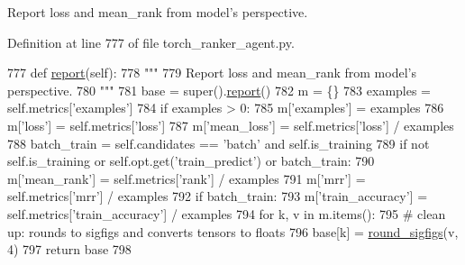 \begin{DoxyVerb}Report loss and mean_rank from model's perspective.
\end{DoxyVerb}
 

Definition at line 777 of file torch\+\_\+ranker\+\_\+agent.\+py.


\begin{DoxyCode}
777     \textcolor{keyword}{def }\hyperlink{namespaceprojects_1_1convai2_1_1eval__f1_a01a47b9c08dad189837a51f085defc45}{report}(self):
778         \textcolor{stringliteral}{"""}
779 \textcolor{stringliteral}{        Report loss and mean\_rank from model's perspective.}
780 \textcolor{stringliteral}{        """}
781         base = super().\hyperlink{namespaceprojects_1_1convai2_1_1eval__f1_a01a47b9c08dad189837a51f085defc45}{report}()
782         m = \{\}
783         examples = self.metrics[\textcolor{stringliteral}{'examples'}]
784         \textcolor{keywordflow}{if} examples > 0:
785             m[\textcolor{stringliteral}{'examples'}] = examples
786             m[\textcolor{stringliteral}{'loss'}] = self.metrics[\textcolor{stringliteral}{'loss'}]
787             m[\textcolor{stringliteral}{'mean\_loss'}] = self.metrics[\textcolor{stringliteral}{'loss'}] / examples
788             batch\_train = self.candidates == \textcolor{stringliteral}{'batch'} \textcolor{keywordflow}{and} self.is\_training
789             \textcolor{keywordflow}{if} \textcolor{keywordflow}{not} self.is\_training \textcolor{keywordflow}{or} self.opt.get(\textcolor{stringliteral}{'train\_predict'}) \textcolor{keywordflow}{or} batch\_train:
790                 m[\textcolor{stringliteral}{'mean\_rank'}] = self.metrics[\textcolor{stringliteral}{'rank'}] / examples
791                 m[\textcolor{stringliteral}{'mrr'}] = self.metrics[\textcolor{stringliteral}{'mrr'}] / examples
792             \textcolor{keywordflow}{if} batch\_train:
793                 m[\textcolor{stringliteral}{'train\_accuracy'}] = self.metrics[\textcolor{stringliteral}{'train\_accuracy'}] / examples
794         \textcolor{keywordflow}{for} k, v \textcolor{keywordflow}{in} m.items():
795             \textcolor{comment}{# clean up: rounds to sigfigs and converts tensors to floats}
796             base[k] = \hyperlink{namespaceparlai_1_1agents_1_1legacy__agents_1_1seq2seq_1_1utils__v0_af377ec61bfc0423461e7b409ffc883b9}{round\_sigfigs}(v, 4)
797         \textcolor{keywordflow}{return} base
798 
\end{DoxyCode}
\mbox{\label{classparlai_1_1core_1_1torch__ranker__agent_1_1TorchRankerAgent_ab526b2171567fd980451a795bb639cda}} 
